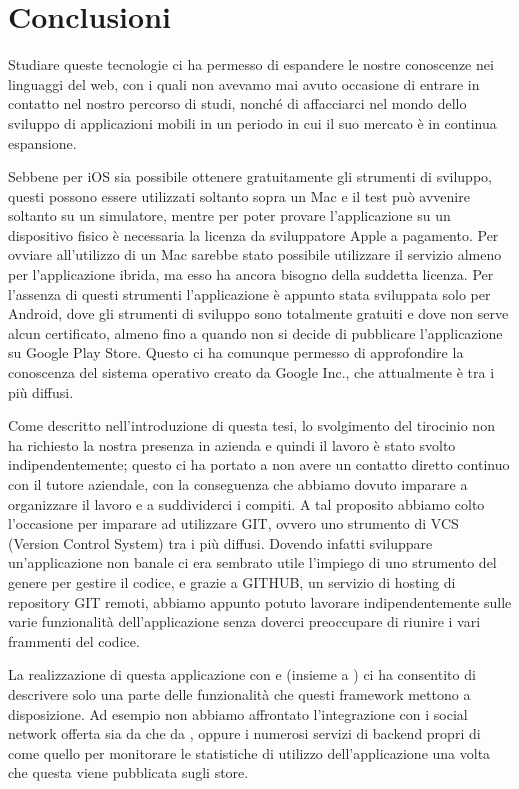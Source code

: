 \chapter{Conclusioni}
    Studiare queste tecnologie ci ha permesso di espandere le nostre
    conoscenze nei linguaggi del web, con i quali non avevamo mai avuto
    occasione di entrare in contatto nel nostro percorso di studi, nonché di
    affacciarci nel mondo dello sviluppo di applicazioni mobili in un periodo in
    cui il suo mercato è in continua espansione.

    Sebbene per iOS
    sia possibile ottenere gratuitamente gli strumenti di sviluppo, questi
    possono essere utilizzati soltanto sopra un Mac e il test può avvenire
    soltanto su un simulatore, mentre per poter provare l'applicazione su un
    dispositivo fisico è necessaria la licenza da sviluppatore Apple a
    pagamento. Per ovviare all'utilizzo di un Mac sarebbe stato
    possibile utilizzare il servizio \pgb{} almeno per l'applicazione
    ibrida, ma
    esso ha ancora bisogno della suddetta licenza. Per l'assenza di questi
    strumenti l'applicazione è appunto stata sviluppata solo per Android, dove
    gli strumenti di sviluppo sono totalmente gratuiti e dove non serve alcun
    certificato, almeno fino a quando non si decide di pubblicare
    l'applicazione su Google Play Store.
    Questo ci ha comunque permesso di approfondire la
    conoscenza del sistema operativo creato da Google Inc., che attualmente è
    tra i più diffusi.

    Come descritto nell'introduzione di questa tesi, lo svolgimento del
    tirocinio non ha richiesto la nostra presenza in azienda e quindi il
    lavoro è stato svolto indipendentemente; questo ci ha portato a non avere
    un contatto diretto continuo con il tutore aziendale, con la conseguenza
    che abbiamo dovuto imparare a organizzare il lavoro e a suddividerci i
    compiti. A tal proposito abbiamo colto l'occasione per imparare ad
    utilizzare GIT, ovvero uno strumento di VCS (Version Control System) tra i più
    diffusi. Dovendo infatti sviluppare un'applicazione non banale ci era
    sembrato utile l'impiego di uno strumento del genere per gestire il codice,
    e grazie a GITHUB, un servizio di hosting di repository GIT remoti, abbiamo
    appunto potuto lavorare indipendentemente sulle varie funzionalità
    dell'applicazione senza doverci preoccupare di riunire i vari frammenti
    del codice.

    La realizzazione di questa applicazione con \tisdk{} e \pg{} (insieme a \kendomob{})
    ci ha consentito di descrivere solo una parte delle funzionalità che
    questi frame\-work mettono a disposizione. Ad esempio non abbiamo affrontato
    l'integrazione con i social network offerta sia da \tisdk{} che da \pg{},
    oppure i numerosi servizi di backend propri di \tisdk{} come quello per
    monitorare le statistiche di utilizzo dell'applicazione una volta che
    questa viene pubblicata sugli store.

